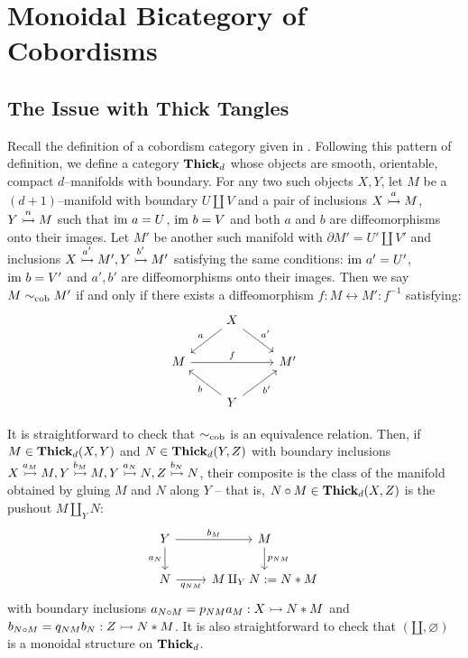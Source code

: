 \documentclass[./Thick_TQFTs_and_Quantum_Information.tex]{subfiles}
\begin{document}
\section{Monoidal Bicategory of Cobordisms}

\subsection{The Issue with Thick Tangles}

Recall the definition of a cobordism category given in \cite{Mahmud2021}.
Following this pattern of definition, we define a category $\Thick_d$ whose
objects are smooth, orientable, compact $d$--manifolds with boundary. For any
two such objects $X, Y$, let $M$ be a $(d + 1)$--manifold with boundary $U
\amalg V$ and a pair of inclusions $X \monic[a] M$, $Y \monic[n] M$ such that
$\im a = U$, $\im b = V$ and both $a$ and $b$ are diffeomorphisms onto their
images. Let $M'$ be another such manifold with $\partial M' = U' \amalg V'$ and
inclusions $X \monic[a'] M', Y \monic[b'] M'$ satisfying the same conditions:
$\im a' = U'$, $\im b = V'$ and $a', b'$ are diffeomorphisms onto their images.
Then we say $M \eqcob M'$ if and only if there exists a diffeomorphism
$f : M \longleftrightarrow M' : f^{-1}$ satisfying:
\begin{equation}\label{diag:eqcob}
  \begin{tikzcd}
    & X \arrow[dl, "a" above left] \arrow[dr, "a'" above right] & \\
    M \arrow[rr, "f" above] &
    & M' \\
    & Y \arrow[ul, "b" below left] \arrow[ur, "b'" below right] &
  \end{tikzcd}
\end{equation}

It is straightforward to check that $\eqcob$ is an equivalence relation. Then,
if $M \in \Thick_d(X, Y)$ and $N \in \Thick_d(Y, Z)$ with boundary inclusions
$X \monic[a_M] M, Y \monic[b_M] M, Y \monic[a_N] N, Z \monic[b_N] N$, their
composite is the class of the manifold obtained by gluing $M$ and $N$ along $Y$
-- that is, $N \circ M \in \Thick_d(X, Z)$ is the pushout $M \amalg_Y N$:
\begin{equation}\label{diag:gluingdef}
  \begin{tikzcd}
    Y \arrow[r, "b_M" above] \arrow[d, "a_N" left] &
    M \arrow[d, "p_{NM}" right] \\
    N \arrow[r, "q_{NM}" below] &
    M \amalg_Y N := N * M
  \end{tikzcd}
\end{equation}
with boundary inclusions
$a_{N \circ M} = p_{NM}a_M : X \monic N * M$ and
$b_{N \circ M} = q_{NM}b_N : Z \monic N * M$. It is also straightforward to
check that $(\amalg, \varnothing)$ is a monoidal structure on $\Thick_d$.
\end{document}
